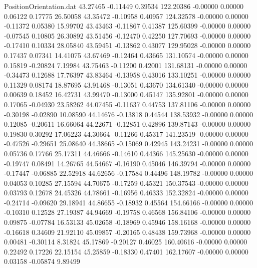 \begin{filecontents}{PositionOrientation.dat}
  43.27465   -0.11449    0.39534   122.20386   -0.00000    0.00000    0.06122    0.17775   26.50058
  43.35472   -0.10958    0.40957   124.32578   -0.00000    0.00000   -0.11372    0.05380   15.99702
  43.43463   -0.11867    0.41387   125.60399   -0.00000    0.00000   -0.07545    0.10805   26.30892
  43.51456   -0.12470    0.42250   127.70693   -0.00000    0.00000   -0.17410    0.10334   28.05840
  43.59451   -0.13862    0.43077   129.95028   -0.00000    0.00000    0.17437    0.07341   14.41075
  43.67469   -0.12464    0.43665   131.10574   -0.00000    0.00000    0.15819   -0.20824    7.19984
  43.75463   -0.11200    0.42001   131.68131   -0.00000    0.00000   -0.34473    0.12688   17.76397
  43.83464   -0.13958    0.43016   133.10251   -0.00000    0.00000    0.11329    0.08174   18.87695
  43.91468   -0.13051    0.43670   134.61340   -0.00000    0.00000    0.00639    0.18452   16.42731
  43.99470   -0.13000    0.45147   135.92801   -0.00000    0.00000    0.17065   -0.04930   23.58262
  44.07455   -0.11637    0.44753   137.81106   -0.00000    0.00000   -0.30198   -0.02890   10.08590
  44.14676   -0.13818    0.44544   138.53932   -0.00000    0.00000    0.12085   -0.20611   16.66064
  44.22671   -0.12851    0.42896   139.87143   -0.00000    0.00000    0.19830    0.30292   17.06223
  44.30664   -0.11266    0.45317   141.23519   -0.00000    0.00000   -0.47526   -0.29651   25.08640
  44.38665   -0.15069    0.42945   143.24231   -0.00000    0.00000    0.05736    0.17766   25.17311
  44.46666   -0.14610    0.44366   145.25630   -0.00000    0.00000   -0.19747    0.08491   14.26765
  44.54667   -0.16190    0.45046   146.39794   -0.00000    0.00000   -0.17447   -0.06885   22.52918
  44.62656   -0.17584    0.44496   148.19782   -0.00000    0.00000    0.04053    0.10285   27.15594
  44.70675   -0.17259    0.45321   150.37543   -0.00000    0.00000    0.03793    0.12678   24.45326
  44.78661   -0.16956    0.46333   152.32824   -0.00000    0.00000   -0.24714   -0.09620   29.18941
  44.86655   -0.18932    0.45564   154.66166   -0.00000    0.00000   -0.10310    0.12528   27.19387
  44.94669   -0.19758    0.46568   156.84106   -0.00000    0.00000    0.09875   -0.07784   16.53133
  45.02658   -0.18969    0.45946   158.16168   -0.00000    0.00000   -0.16618    0.34609   21.92110
  45.09857   -0.20165    0.48438   159.73968   -0.00000    0.00000    0.00481   -0.30114    8.31824
  45.17869   -0.20127    0.46025   160.40616   -0.00000    0.00000    0.22492    0.17226   22.15154
  45.25859   -0.18330    0.47401   162.17607   -0.00000    0.00000    0.03158   -0.05874    9.89499

\end{filecontents}
